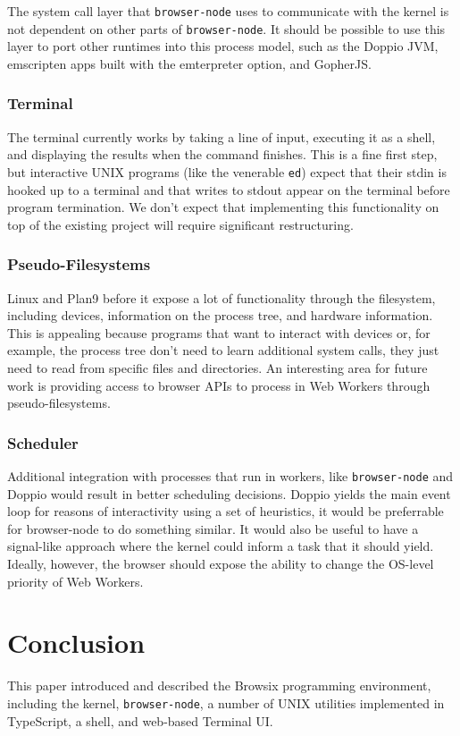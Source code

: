 \documentclass{acm_proc_article-sp}
\begin{document}
The system call layer that \texttt{browser-node} uses to communicate
with the kernel is not dependent on other parts of
\texttt{browser-node}.  It should be possible to use this layer to
port other runtimes into this process model, such as the Doppio JVM,
emscripten apps built with the emterpreter option, and GopherJS.

\subsubsection{Terminal}

The terminal currently works by taking a line of input, executing it
as a shell, and displaying the results when the command finishes.
This is a fine first step, but interactive UNIX programs (like the
venerable \texttt{ed}) expect that their stdin is hooked up to a
terminal and that writes to stdout appear on the terminal before
program termination.  We don't expect that implementing this
functionality on top of the existing project will require significant
restructuring.

\subsubsection{Pseudo-Filesystems}

Linux and Plan9 before it expose a lot of functionality through the
filesystem, including devices, information on the process tree, and
hardware information.  This is appealing because programs that want to
interact with devices or, for example, the process tree don't need to
learn additional system calls, they just need to read from specific
files and directories.  An interesting area for future work is
providing access to browser APIs to process in Web Workers through
pseudo-filesystems.

\subsubsection{Scheduler}

Additional integration with processes that run in workers, like
\texttt{browser-node} and Doppio would result in better scheduling
decisions.  Doppio yields the main event loop for reasons of
interactivity using a set of heuristics, it would be preferrable for
browser-node to do something similar.  It would also be useful to have
a signal-like approach where the kernel could inform a task that it
should yield.  Ideally, however, the browser should expose the ability
to change the OS-level priority of Web Workers.

\section{Conclusion}

This paper introduced and described the Browsix programming
environment, including the kernel, \texttt{browser-node}, a number of
UNIX utilities implemented in TypeScript, a shell, and web-based
Terminal UI.




\balancecolumns
\end{document}
